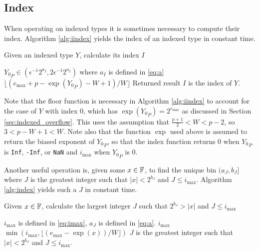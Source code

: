   \subsection{Index}
    \label{sec:primitiveops_index}
    When operating on indexed types it is sometimes necessary to compute their
    index. Algorithm \ref{alg:iindex} yields the index of an indexed type in
    constant time.

    \begin{samepage}
    \begin{alg}
      Given an indexed type $Y$, calculate its index $I$
      \begin{algorithmic}[1]
        \Require
          \Statex ${Y_0}_P \in (\epsilon^{-1}  2^{a_{I}}, 2  \epsilon^{-1}  2^{a_I})$
          where $a_I$ is defined in \eqref{eq:a}
          \State \Return $\lfloor(e_{\max} + p - \exp({Y_0}_P) - W + 1)/W\rfloor$
        \EndFunction
        \Ensure
          \Statex Returned result $I$ is the index of $Y$.
      \end{algorithmic}
      \label{alg:iindex}
    \end{alg}
    \end{samepage}

    Note that the floor function is necessary in Algorithm \ref{alg:iindex} to
    account for the case of $Y$ with index $0$, which has $\exp({Y_0}_P) =
    2^{e_{\max}}$ as discussed in Section \ref{sec:indexed_overflow}.  This
    uses the assumption that $\frac{p+1}{2} < W < p-2$, so $3 < p - W + 1 < W.$ 
    Note also that the function $\exp$ used above is assumed to return the biased exponent of ${Y_0}_P$, so that the index function returns 0 when ${Y_0}_P$ is \texttt{Inf}, \texttt{-Inf}, or \texttt{NaN} and $i_{\max}$ when ${Y_0}_P$ is 0.

    Another useful operation is, given some $x \in \mathbb{F}$, to find the unique bin
    $(a_J, b_J]$ where $J$ is the greatest integer such that $|x| < 2^{b_J}$ and $J \leq i_{\max}$.
    Algorithm \ref{alg:index} yields such a $J$ in constant time.

    \begin{samepage}
    \begin{alg}
      Given $x \in \mathbb{F}$, calculate the largest integer $J$ such that $2^{b_J} > |x|$ and $J \leq i_{\max}$
      \begin{algorithmic}[1]
        \Require $i_{\max}$ is defined in \eqref{eq:imax},
          $a_J$ is defined in \eqref{eq:a}.
           \State \Return $i_{\max}$ \EndIf
          \State \Return $\min(i_{\max}, \lfloor(e_{\max} - \exp(x))/W\rfloor)$
        \EndFunction
        \Ensure
          \Statex $J$ is the greatest integer such that $|x| < 2^{b_J}$ and $J \leq i_{\max}$.
      \end{algorithmic}
      \label{alg:index}
    \end{alg}
     \end{samepage}

